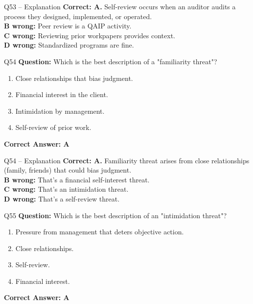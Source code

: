 \documentclass[aspectratio=169,10pt]{beamer}
\begin{document}
	\begin{frame}[t]{Q53 -- Explanation}
		\small
		\textbf{Correct: A.} Self-review occurs when an auditor audits a process they designed, implemented, or operated. \\[4pt]
		\textbf{B wrong:} Peer review is a QAIP activity. \\[2pt]
		\textbf{C wrong:} Reviewing prior workpapers provides context. \\[2pt]
		\textbf{D wrong:} Standardized programs are fine.
	\end{frame}
	
	\begin{frame}[t]{Q54}
		\small
		\textbf{Question:} Which is the best description of a "familiarity threat"?
		\begin{enumerate}[label=\Alph*.,itemsep=1pt,topsep=2pt]
			\item Close relationships that bias judgment.
			\item Financial interest in the client.
			\item Intimidation by management.
			\item Self-review of prior work.
		\end{enumerate}
		\vspace{4pt}
		\textbf{Correct Answer: A}
	\end{frame}
	
	\begin{frame}[t]{Q54 -- Explanation}
		\small
		\textbf{Correct: A.} Familiarity threat arises from close relationships (family, friends) that could bias judgment. \\[4pt]
		\textbf{B wrong:} That's a financial self-interest threat. \\[2pt]
		\textbf{C wrong:} That's an intimidation threat. \\[2pt]
		\textbf{D wrong:} That's a self-review threat.
	\end{frame}
	
	\begin{frame}[t]{Q55}
		\small
		\textbf{Question:} Which is the best description of an "intimidation threat"?
		\begin{enumerate}[label=\Alph*.,itemsep=1pt,topsep=2pt]
			\item Pressure from management that deters objective action.
			\item Close relationships.
			\item Self-review.
			\item Financial interest.
		\end{enumerate}
		\vspace{4pt}
		\textbf{Correct Answer: A}
	\end{frame}
	
\end{document}
